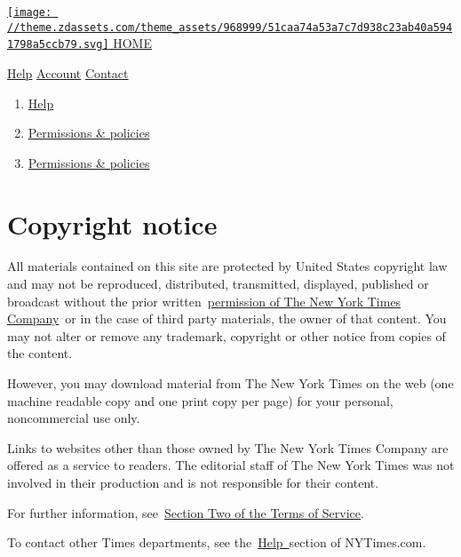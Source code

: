 \href{https://nytimes3xbfgragh.onion}{\texttt{[image: //theme.zdassets.com/theme\_assets/968999/51caa74a53a7c7d938c23ab40a5941798a5ccb79.svg]}
HOME}

\href{/hc/en-us}{Help} \textbar{}
\href{https://myaccount.nytimes3xbfgragh.onion/seg/}{Account} \textbar{}
\href{https://help.nytimes3xbfgragh.onion/hc/en-us/articles/115015385887-Contact-Us}{Contact}

\begin{enumerate}
\def\labelenumi{\arabic{enumi}.}
\tightlist
\item
  \href{/hc/en-us}{Help}
\item
  \href{/hc/en-us/categories/115001547468-Permissions-policies}{Permissions
  \& policies}
\item
  \href{/hc/en-us/sections/115002797688-Permissions-policies}{Permissions
  \& policies}
\end{enumerate}

\hypertarget{copyright-notice}{%
\section{Copyright notice}\label{copyright-notice}}

All materials contained on this site are protected by United States
copyright law and may not be reproduced, distributed, transmitted,
displayed, published or broadcast without the prior
written~\href{http://www.nytimes3xbfgragh.onion/content/help/rights/permissions/permissions.html}{permission
of The New York Times Company}~or in the case of third party materials,
the owner of that content. You may not alter or remove any trademark,
copyright or other notice from copies of the content.

However, you may download material from The New York Times on the web
(one machine readable copy and one print copy per page) for your
personal, noncommercial use only.

Links to websites other than those owned by The New York Times Company
are offered as a service to readers. The editorial staff of The New York
Times was not involved in their production and is not responsible for
their content.

For further information,
see~\href{http://www.nytimes3xbfgragh.onion/content/help/rights/terms/terms-of-service.html\#b}{Section
Two of the Terms of Service}.

To contact other Times departments, see
the~\href{https://help.nytimes3xbfgragh.onion/hc/en-us}{Help~}section of
NYTimes.com.

